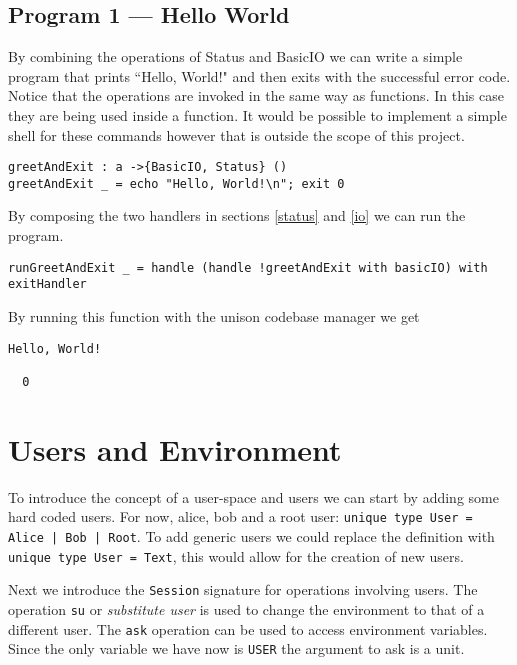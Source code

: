 \documentclass[logo,bsc,singlespacing,parskip]{infthesis}
\begin{document}
\begin{tcolorbox}[colback=gray!10, colframe=black, arc=0pt, outer arc=0pt]

\section*{Program 1 --- Hello World}

By combining the operations of Status and BasicIO we can write a simple program that prints ``Hello, World!" and then exits with the successful error code. Notice that the operations are invoked in the same way as functions. In this case they are being used inside a function. It would be possible to implement a simple shell for these commands however that is outside the scope of this project.

\begin{lstlisting}[language=unison]
greetAndExit : a ->{BasicIO, Status} ()
greetAndExit _ = echo "Hello, World!\n"; exit 0
\end{lstlisting}

By composing the two handlers in sections \ref{status} and \ref{io} we can run the program.

\begin{lstlisting}[language=unison]
runGreetAndExit _ = handle (handle !greetAndExit with basicIO) with exitHandler
\end{lstlisting}

By running this function with the unison codebase manager we get

\begin{lstlisting}[style=terminal]
Hello, World!

  0
\end{lstlisting}
\end{tcolorbox}

\section{Users and Environment}

To introduce the concept of a user-space and users we can start by adding some
hard coded users. For now, alice, bob and a root user: \texttt{unique type User
= Alice | Bob | Root}. To add generic users we could replace the definition with 
\texttt{unique type User = Text}, this would allow for the creation of new users.

Next we introduce the \texttt{Session} signature for operations involving
users. The operation \texttt{su} or \emph{substitute user} is used to change
the environment to that of a different user. The \texttt{ask} operation can be
used to access environment variables. Since the only variable we have now is
\texttt{USER} the argument to ask is a unit.
\end{document}
